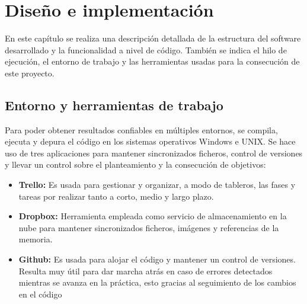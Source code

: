 \documentclass[a4paper, 12pt]{book}
\begin{document}


\cleardoublepage
\chapter{Diseño e implementación}

En este capítulo se realiza una descripción detallada de la estructura del software desarrollado y la funcionalidad a nivel de código. También se indica el hilo de ejecución, el entorno de trabajo y las herramientas usadas para la consecución de este proyecto.

\section{Entorno y herramientas de trabajo} 
\label{sec:entorno}

Para poder obtener resultados confiables en múltiples entornos, se compila, ejecuta y depura el código en los sistemas operativos Windows e UNIX. Se hace uso de tres aplicaciones para mantener sincronizados ficheros, control de versiones y llevar un control sobre el planteamiento y la consecución de objetivos:

\begin{itemize}
  \item \textbf{Trello:} Es usada para gestionar y organizar, a modo de tableros, las fases y tareas por realizar tanto a corto, medio y largo plazo. 
  \item \textbf{Dropbox:} Herramienta empleada como servicio de almacenamiento en la nube para mantener sincronizados ficheros, imágenes y referencias de la memoria.
  \item \textbf{Github:} Es usada para alojar el código y mantener un control de versiones. Resulta muy útil para dar marcha atrás en caso de errores detectados mientras se avanza en la práctica, esto gracias al seguimiento de los cambios en el código
\end{itemize}
\end{document}
